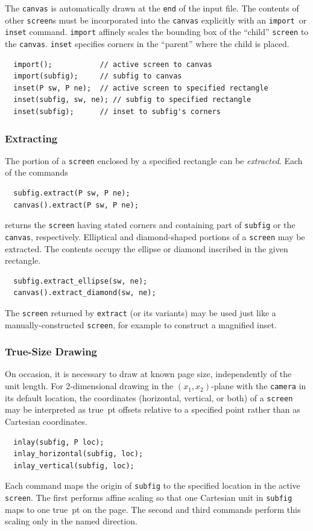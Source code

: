 \documentclass[12pt,letterpaper]{book}
\newcommand{\code}[1]{\texttt{#1}}
\newcommand{\teximath}[1]{$#1$}
\newcommand{\findex}[1]{\ignorespaces}
\begin{document}
The \code{canvas} is automatically drawn at the \code{end} of the
input file. The contents of other \code{screen}s must be incorporated
into the \code{canvas} explicitly with an \code{import}~or
\code{inset} command. \code{import} affinely scales the bounding box
of the ``child'' \code{screen} to the \code{canvas}. \code{inset}
specifies corners in the ``parent'' where the child is
placed.
\findex{import}
\findex{inset}
\begin{verbatim}
  import();           // active screen to canvas
  import(subfig);     // subfig to canvas
  inset(P sw, P ne);  // active screen to specified rectangle
  inset(subfig, sw, ne); // subfig to specified rectangle
  inset(subfig);      // inset to subfig's corners
\end{verbatim}


\subsubsection*{Extracting}

The portion of a \code{screen} enclosed by a specified rectangle can
be \emph{extracted}. Each of the commands
\findex{extract}
\findex{canvas}
\begin{verbatim}
  subfig.extract(P sw, P ne);
  canvas().extract(P sw, P ne);
\end{verbatim}
returns the \code{screen} having stated corners and containing part of
\code{subfig} or the \code{canvas}, respectively. Elliptical and
diamond-shaped portions of a \code{screen} may be extracted.  The
contents occupy the ellipse or diamond inscribed in the given
rectangle.
\findex{extract\_diamond}
\findex{extract\_ellipse}
\begin{verbatim}
  subfig.extract_ellipse(sw, ne);
  canvas().extract_diamond(sw, ne);
\end{verbatim}
The \code{screen} returned by \code{extract} (or its variants) may be
used just like a manually-constructed \code{screen}, for example to
construct a magnified inset. 


\subsubsection*{True-Size Drawing}
\label{truesize}

On occasion, it is necessary to draw at known page size, independently
of the unit length. For 2-dimensional drawing in the
\teximath{(x_1,x_2)}-plane with the \code{camera} in its default
location, the coordinates (horizontal, vertical, or both) of a
\code{screen} may be interpreted as true~pt offsets relative to a
specified point rather than as Cartesian coordinates.
\findex{inlay}
\findex{inlay\_horizontal}
\findex{inlay\_vertical}
\begin{verbatim}
  inlay(subfig, P loc);
  inlay_horizontal(subfig, loc);
  inlay_vertical(subfig, loc);
\end{verbatim}
Each command maps the origin of \code{subfig} to the specified
location in the active \code{screen}. The first performs affine
scaling so that one Cartesian unit in \code{subfig} maps to one
true~pt on the page.  The second and third commands perform this
scaling only in the named direction.
\end{document}
